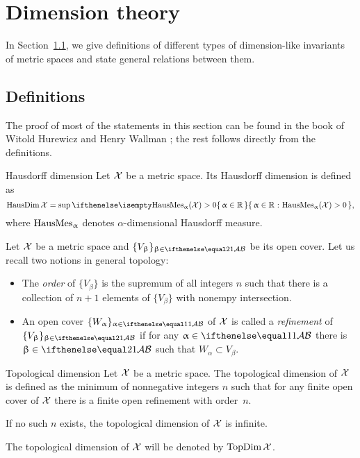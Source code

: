 \chapter{Dimension theory}

In Section~\ref{sec:prelim:dim}, we give definitions of different types of dimension-like invariants of metric spaces and state general relations between them.


\section{Definitions}\label{sec:prelim:dim}

The proof of most of the statements in this section can be found in the book of Witold Hurewicz and Henry Wallman \cite{hurewicz-wallman}; 
the rest follows directly from the definitions.

\begin{thm}{Hausdorff dimension}
\label{def:HausDim}
Let $\mathcal{X}$ be a metric space. 
Its Hausdorff dimension is defined as
\[\HausDim\spc{X}=\sup\set{\alpha\in\RR}{\HausMes_\alpha(\spc{X})>0},\]
 where $\mathop{\rm HausMes}\nolimits_\upalpha$ denotes $\alpha$-dimensional Hausdorff measure. %
\end{thm}

Let $\mathcal{X}$ be a metric space and $\{V_\beta\}_{\beta\in\IndexSet[2]}$
 be its open cover.
Let us recall two notions in general topology:
\begin{itemize}

\item The \emph{order} of $\{V_\beta\}$ is the supremum of all integers $n$ such that there is a collection of $n+1$ elements of $\{V_\beta\}$ with nonempy intersection.

\item An open cover $\{W_\alpha\}_{\alpha\in\IndexSet}$ of $\mathcal{X}$ is called a \emph{refinement} of  $\{V_\beta\}_{\beta\in\IndexSet[2]}$ if for any $\alpha\in\IndexSet$ there is $\beta\in\IndexSet[2]$ such that $W_\alpha\subset V_\beta$.

\end{itemize}

\begin{thm}{Topological dimension}
\label{def:TopDim}
Let $\mathcal{X}$ be a metric space. 
The topological dimension of $\mathcal{X}$ is defined as the minimum of nonnegative integers $n$ 
such that for any finite open cover of $\mathcal{X}$ there is a finite open refinement with order~$n$.

If no such $n$ exists, the topological dimension of $\mathcal{X}$ is infinite.

The topological dimension of $\mathcal{X}$ will be denoted by $\mathop{\rm TopDim}\nolimits\mathcal{X}$.
\end{thm}

